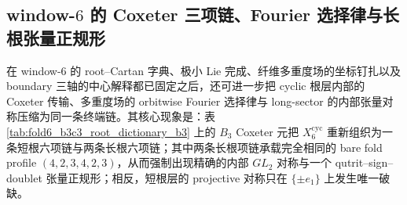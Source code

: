 \subsection{window-\texorpdfstring{$6$}{6} 的 Coxeter 三项链、Fourier 选择律与长根张量正规形}\label{subsec:conclusion-window6-coxeter-necklace-fourier-doublet-normal-form}
在 window-\(6\) 的 root--Cartan 字典、极小 Lie 完成、纤维多重度场的坐标钉扎以及 boundary 三轴的中心解释都已固定之后，还可进一步把 cyclic 根层内部的 Coxeter 传输、多重度场的 orbitwise Fourier 选择律与 long-sector 的内部张量对称压缩为同一条终端链。其核心现象是：表 \ref{tab:fold6_b3c3_root_dictionary_b3} 上的 \(B_3\) Coxeter 元把 \(X_6^{\mathrm{cyc}}\) 重新组织为一条短根六项链与两条长根六项链；其中两条长根项链承载完全相同的 bare fold profile \((4,2,3,4,2,3)\)，从而强制出现精确的内部 \(GL_2\) 对称与一个 qutrit--sign--doublet 张量正规形；相反，短根层的 projective 对称只在 \(\{\pm e_1\}\) 上发生唯一破缺。

